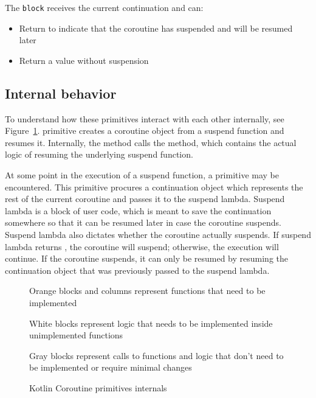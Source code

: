 The \texttt{block} receives the current continuation and can:
\begin{itemize}
    \item Return \COROUTINESUSPENDED to indicate that the coroutine has suspended and will be resumed later
    \item Return a value without suspension
\end{itemize}

\subsection{Internal behavior}

To understand how these primitives interact with each other internally, see Figure~\ref{fig:coroutine-primitives-full}.
\startCoroutineUninterceptedOrReturn primitive creates a coroutine object  from a suspend
function and resumes it. Internally, the  method calls the
 method, which contains the actual logic of resuming the underlying suspend function.

At some point in the execution of a suspend function, a \suspendCoroutineUninterceptedOrReturn primitive may be
encountered. This primitive procures a continuation object which represents the rest of the current coroutine and
passes it to the suspend lambda. Suspend lambda is a block of user code, which is meant to save the continuation
somewhere so that it can be resumed later in case the coroutine suspends. Suspend lambda also dictates whether the
coroutine actually suspends. If suspend lambda returns \COROUTINESUSPENDED, the coroutine will suspend; otherwise,
the execution will continue. If the coroutine suspends, it can only be resumed by resuming the continuation object
that was previously passed to the suspend lambda.

\begin{figure}[H]
    \centering
    \resizebox{\textwidth}{!}{}
    \caption{Kotlin Coroutine primitives internals}
    \begin{description}
        \item Orange blocks and columns represent functions that need to be implemented
        \item White blocks represent logic that needs to be implemented inside unimplemented functions
        \item Gray blocks represent calls to functions and logic that don't need to be implemented
        or require minimal changes
    \end{description}
    \label{fig:coroutine-primitives-full}
\end{figure}

